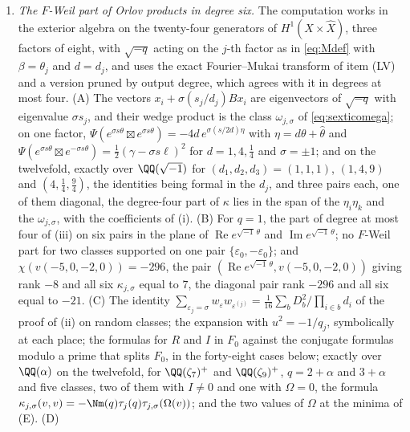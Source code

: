 \begin{enumerate}[label=\textup{(\Roman*)},leftmargin=*]
\item \emph{The $F$-Weil part of Orlov products in degree six.} The
  computation works in the exterior algebra on the twenty-four generators of
  $H^{1}(X\times\widehat X)$, three factors of eight, with $\sqrt{-q}$ acting
  on the $j$-th factor as in \eqref{eq:Mdef} with $\beta=\theta_{j}$ and
  $d=d_{j}$, and uses the exact Fourier--Mukai transform of item (LV) and a
  version pruned by output degree, which agrees with it in degrees at most
  four. (A) The vectors $x_{i}+\sigma(s_{j}/d_{j})Bx_{i}$ are eigenvectors of
  $\sqrt{-q}$ with eigenvalue $\sigma s_{j}$, and their wedge product is the
  class $\omega_{j,\sigma}$ of \eqref{eq:sexticomega}; on one factor,
  $\Psi(e^{\sigma s\theta}\boxtimes e^{\sigma s\theta})=-4d\,
  e^{\sigma(s/2d)\eta}$ with $\eta=d\theta+\widehat\theta$ and
  $\Psi(e^{\sigma s\theta}\boxtimes e^{-\sigma s\theta})
  =\frac12(\gamma-\sigma s\ell)^{2}$ for $d=1,4,\frac14$ and $\sigma=\pm1$;
  and on the twelvefold, exactly over $\QQ(\sqrt{-1})$ for
  $(d_{1},d_{2},d_{3})=(1,1,1)$, $(1,4,9)$ and $(4,\frac14,\frac94)$, the
  identities being formal in the $d_{j}$, and three pairs each, one of them
  diagonal, the degree-four part of $\kappa$ lies in the span of the
  $\eta_{i}\eta_{k}$ and the $\omega_{j,\sigma}$, with the coefficients of
  (i). (B) For $q=1$, the part of degree at most four of
  (iii) on six pairs in the plane of
  $\operatorname{Re}e^{\sqrt{-1}\,\theta}$ and
  $\operatorname{Im}e^{\sqrt{-1}\,\theta}$; no $F$-Weil part for two classes
  supported on one pair $\{\varepsilon_{0},-\varepsilon_{0}\}$; and
  $\chi(v(-5,0,-2,0))=-296$, the pair $(\operatorname{Re}
  e^{\sqrt{-1}\,\theta},v(-5,0,-2,0))$ giving rank $-8$ and all six
  $\kappa_{j,\sigma}$ equal to $7$, the diagonal pair rank $-296$ and all
  six equal to $-21$. (C) The identity $\sum_{\varepsilon_{j}=\sigma}
  w_{\varepsilon}w_{\varepsilon^{(j)}}=\frac1{16}\sum_{b}D_{b}^{2}/
  \prod_{i\in b}d_{i}$ of the proof of (ii) on random
  classes; the expansion with $u^{2}=-1/q_{j}$, symbolically at each place;
  the formulas for $R$ and $I$ in $F_{0}$ against the conjugate formulas
  modulo a prime that splits $F_{0}$, in the forty-eight cases below; exactly
  over $\QQ(\alpha)$ on the twelvefold, for $\QQ(\zeta_{7})^{+}$ and
  $\QQ(\zeta_{9})^{+}$, $q=2+\alpha$ and $3+\alpha$ and five classes, two of
  them with $I\ne0$ and one with $\Omega=0$, the formula
  $\kappa_{j,\sigma}(v,v)=-\Nm(q)\tau_{j}(q)\tau_{j,\sigma}(\Omega(v))$; and
  the two values of $\Omega$ at the minima of (E). (D)

\end{enumerate}
